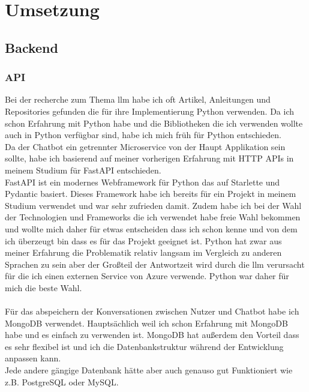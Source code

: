 \chapter{Umsetzung}\label{ch:umsetzung}
\section{Backend}\label{sec:umsetzung_backend}
\subsection{API}\label{sec:umsetzung_api}
Bei der recherche zum Thema \gls{llm} habe ich oft Artikel, Anleitungen und Repositories gefunden die für ihre Implementierung Python verwenden.
Da ich schon Erfahrung mit Python habe und die Bibliotheken die ich verwenden wollte auch in Python verfügbar sind, habe ich mich früh für Python entschieden.\\
Da der Chatbot ein getrennter Microservice von der Haupt Applikation sein sollte, habe ich basierend auf meiner vorherigen Erfahrung mit HTTP APIs in meinem Studium für FastAPI entschieden.\\
FastAPI ist ein modernes Webframework für Python das auf Starlette und Pydantic basiert. 
Dieses Framework habe ich bereits für ein Projekt in meinem Studium verwendet und war sehr zufrieden damit.
Zudem habe ich bei der Wahl der Technologien und Frameworks die ich verwendet habe freie Wahl bekommen und wollte
mich daher für etwas entscheiden dass ich schon kenne und von dem ich überzeugt bin dass es für das Projekt geeignet ist.
Python hat zwar aus meiner Erfahrung die Problematik relativ langsam im Vergleich zu anderen Sprachen zu sein aber der Großteil der Antwortzeit wird durch die \gls{llm} verursacht 
für die ich einen externen Service von Azure verwende. Python war daher für mich die beste Wahl.\\\\
Für das abspeichern der Konversationen zwischen Nutzer und Chatbot habe ich\\MongoDB verwendet. Hauptsächlich weil ich schon Erfahrung mit MongoDB habe und es einfach zu verwenden ist.
MongoDB hat außerdem den Vorteil dass es sehr flexibel ist und ich die Datenbankstruktur während der Entwicklung anpassen kann.\\
Jede andere gängige Datenbank hätte aber auch genauso gut Funktioniert wie z.B. PostgreSQL oder MySQL.\\

